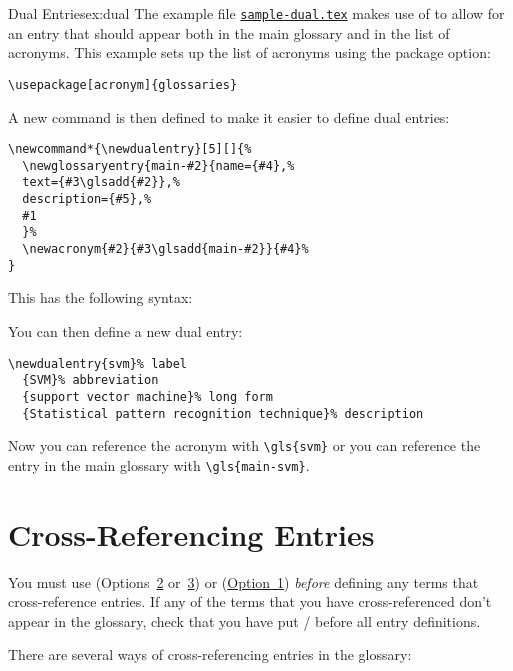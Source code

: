 \documentclass[report,inlinetitle]{nlctdoc}
\newcommand*{\opt}[1]{\hyperlink{option#1}{Option~#1}}
\newcommand*{\optsor}[2]{Options~\hyperlink{option#1}{#1}
or~\hyperlink{option#2}{#2}}
\newcounter{sample}
\newcommand*{\samplefile}[2][sample]{%
  \hyperref[ex:#1#2]{\texttt{#1#2.tex}}}
\begin{document}
\begin{example}{Dual Entries}{ex:dual}
The example file \samplefile{-dual} makes use of  to
allow for an entry that should appear both in the main glossary and
in the list of acronyms. This example sets up the list of acronyms
using the  package option:
\begin{verbatim}
\usepackage[acronym]{glossaries}
\end{verbatim}
A new command is then defined to make it easier to define dual
entries:
\begin{verbatim}
\newcommand*{\newdualentry}[5][]{%
  \newglossaryentry{main-#2}{name={#4},%
  text={#3\glsadd{#2}},%
  description={#5},%
  #1
  }%
  \newacronym{#2}{#3\glsadd{main-#2}}{#4}%
}
\end{verbatim}
This has the following syntax:
\begin{alltt}
\end{alltt}
You can then define a new dual entry:
\begin{verbatim}
\newdualentry{svm}% label
  {SVM}% abbreviation
  {support vector machine}% long form
  {Statistical pattern recognition technique}% description
\end{verbatim}
Now you can reference the acronym with \verb|\gls{svm}| or you can
reference the entry in the main glossary with \verb|\gls{main-svm}|.
\end{example}

\chapter{Cross-Referencing Entries}
\label{sec:crossref}

\begin{important}
You must use  (\optsor23) or
 (\opt1) \emph{before} defining any
terms that cross-reference entries. If any of the terms that you have
cross-referenced don't appear in the glossary, check that you have
put \slash{} before all 
entry definitions.
\end{important}

There are several ways of cross-referencing entries in the 
glossary: 
\end{document}
